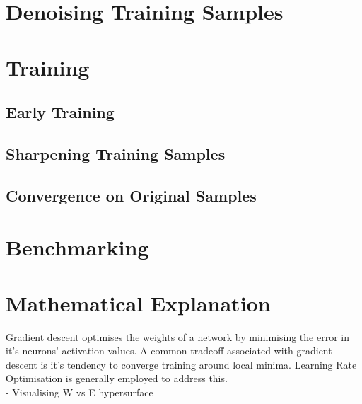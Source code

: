 \documentclass[12pt]{article}
\begin{document}
\begin{multicols}{2}
		\section{Denoising Training Samples}
		
		\section{Training}
			\subsection{Early Training}
			\subsection{Sharpening Training Samples}
			\subsection{Convergence on Original Samples}
			
		\section{Benchmarking}
		
		\section{Mathematical Explanation}
		Gradient descent optimises the weights of a network by minimising the error in it's neurons' activation values. A common tradeoff associated with gradient descent is it's tendency to converge training around local minima. Learning Rate Optimisation is generally employed to address this.
		\\
		- Visualising W vs E hypersurface
		
	\end{multicols}

	\begin{multicols}{2}
		
	\end{multicols}
	
	
	
	
	
\end{document}

